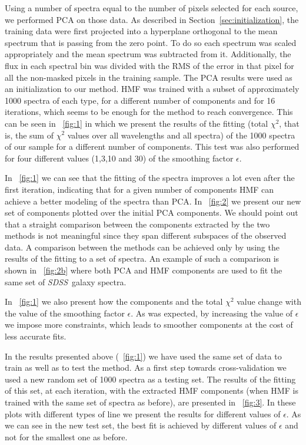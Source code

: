 \documentclass[12pt,preprint]{aastex}
\newcommand{\project}[1]{\textsl{#1}}
\newcommand{\sdss}{\project{SDSS}}
\newcommand{\SDSS}{\sdss}
\newcommand{\sectionname}{Section}
\begin{document}
Using a number of spectra equal to the number of pixels selected for
each source, we performed PCA on those data. As described in 
\sectionname~\ref{sec:initialization}, the training data were
first projected into a hyperplane orthogonal to the mean
spectrum that is passing from the zero point. To do so each spectrum 
was scaled appropriately and the mean spectrum was subtracted from it. 
Additionally, the flux in each spectral bin was divided
with the RMS of the error in that pixel for all the non-masked pixels in
the training sample. The PCA results were used as an initialization to
our method. HMF was trained with a subset of approximately 1000
spectra of each type, for a different number of components and for 16
iterations, which seems to be enough for the method to reach convergence. This
can be seen in \figurename~\ref{fig:1} in which we present the results of
the fitting (total $\chi^2$, that is, the sum of $\chi^2$ values over all
wavelengths and all spectra) of the 1000 spectra of our sample for a
different number of components. This test was also performed for four
different values (1,3,10 and 30) of the smoothing factor $\epsilon$.

In \figurename~\ref{fig:1} we can see that the fitting of the spectra
improves a lot even after the first iteration, indicating that for a 
given number of components HMF can achieve a better
modeling of the spectra than PCA. In \figurename~\ref{fig:2} 
we present our new set of components plotted over the
initial PCA components. We should point out that a straight comparison
between the components extracted by the two methods is not meaningful
since they span different subspaces of the observed data. A 
comparison between the methods can be achieved only by using
the results of the fitting to a set of spectra. An example of such a 
comparison is shown in \figurename~\ref{fig:2b} where both PCA and HMF 
components are used to fit the same set of \SDSS\ galaxy spectra.

In \figurename~\ref{fig:1} we also present how the components and the
total $\chi^2$ value change with the value of the smoothing factor
$\epsilon$. As was expected, by increasing the value of $\epsilon$ we 
impose more constraints, which leads to smoother components at the 
cost of less accurate fits. 

In the results presented above (\figurename~\ref{fig:1}) we have used
the same set of data to train as well as to test the method. As a
first step towards cross-validation we used a new random set of 1000
spectra as a testing set. The results of the fitting of this set, at
each iteration, with the extracted HMF components (when HMF is 
trained with the same set of spectra as before), are presented in
\figurename~\ref{fig:3}. In these plots with different types of line
we present the results for different values of $\epsilon$. As we can
see in the new test set, the best fit is achieved by different values
of $\epsilon$ and not for the smallest one as before.
\end{document}
